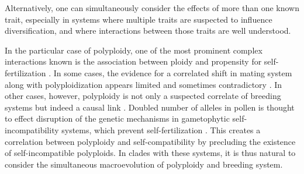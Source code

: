 Alternatively, one can simultaneously consider the effects of more than one known trait, especially in systems where multiple traits are suspected to influence diversification, and where interactions between those traits are well understood.

In the particular case of polyploidy,  one of the most prominent complex interactions known is the association between ploidy and propensity for self-fertilization \citep{stebbins1950}. %
In some cases, the evidence for a correlated shift in mating system along with polyploidization appears limited and sometimes contradictory \citep{barringer2007, barrett2008, husband2008}.
In other cases, however, polyploidy is not only a suspected correlate of breeding systems but indeed a causal link \citep{stout1942, lewis1947}.
Doubled number of alleles in pollen is thought to effect disruption of the genetic mechanisms in gametophytic self-incompatibility systems, which prevent self-fertilization \citep{entani1999, tsukamoto2005, kubo2010}. 
This creates a correlation between polyploidy and self-compatibility by precluding the existence of self-incompatible polyploids.
In clades with these systems, it is thus natural to consider the simultaneous macroevolution of polyploidy and breeding system.

